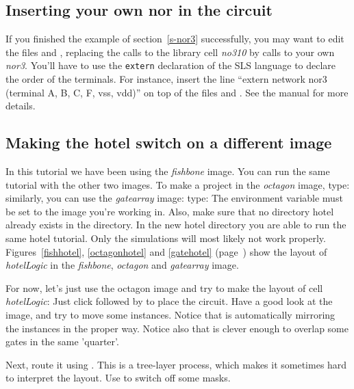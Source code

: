 \subsection{Inserting your own nor in the circuit}
If you finished the example of section~\ref{s-nor3} successfully, you may want
to edit the files  and , replacing the
calls to the library cell {\sl no310} by calls to your own {\sl nor3}. You'll
have to use the {\tt extern} declaration of the SLS language to declare the
order of the terminals. For instance, insert the line ``extern network
nor3 (terminal A, B, C, F, vss, vdd)'' on top of the files  and
. See the  manual for more details.

\subsection{Making the hotel switch on a different image}
In this tutorial we have been using the {\sl fishbone} image. You can run the
same tutorial with the other two images. To make a project in the {\sl octagon}
image, type: \cd{}
 
similarly, you can use the {\sl gatearray} image:
type: \cd{}
 
The environment variable  must be set to the image you're
working in. Also, make sure that no directory hotel already exists in the
directory. In the new hotel directory you are able to run the same hotel
tutorial. Only the
 simulations will most likely not work properly.
Figures~\ref{fishhotel}, \ref{octagonhotel} and \ref{gatehotel}
(page~\pageref{octagonhotel}) show the layout of {\sl hotelLogic} in the {\sl
fishbone}, {\sl octagon} and {\sl gatearray} image.

For now, let's just use the octagon image and try to make the layout of cell
{\sl hotelLogic}:
Just click  followed by  to place the
circuit. Have a good look at the image, and try to move some instances.
Notice that  is automatically mirroring the instances in the
proper way.  Notice also that  is clever enough to overlap
some gates in the same 'quarter'.

Next, route it using . This is a tree-layer process, which makes
it sometimes hard to interpret the layout. Use  to switch off
some masks. 

